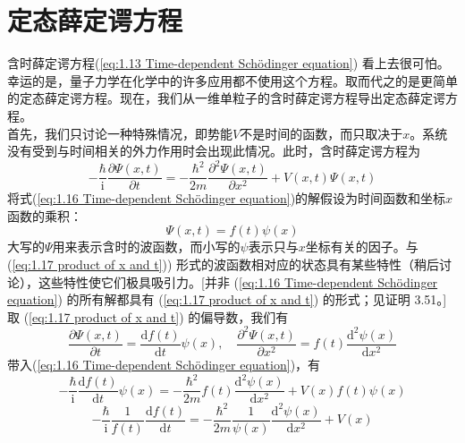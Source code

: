 	\section{定态薛定谔方程}
	含时薛定谔方程(\ref{eq:1.13 Time-dependent Schödinger equation}) 看上去很可怕。幸运的是，量子力学在化学中的许多应用都不使用这个方程。取而代之的是更简单的定态薛定谔方程。现在，我们从一维单粒子的含时薛定谔方程导出定态薛定谔方程。\\
	\indent 首先，我们只讨论一种特殊情况，即势能$V$不是时间的函数，而只取决于$x$。系统没有受到与时间相关的外力作用时会出现此情况。此时，含时薛定谔方程为
	\begin{equation}
		-\frac{\hbar}{\mathrm{i}}\frac{\partial \Psi \left(x,t\right)}{\partial t}= -\frac{\hbar^2}{2m}\frac{\partial^2 \Psi \left(x,t\right)}{\partial x^2}+ V\left(x,t\right)\Psi\left(x,t\right)
		\label{eq:1.16 Time-dependent Schödinger equation}
	\end{equation}
	将式(\ref{eq:1.16 Time-dependent Schödinger equation})的解假设为时间函数和坐标$x$函数的乘积：
	\begin{equation}
		\boxed{\Psi\left(x,t\right)=f\left(t\right)\psi\left(x\right)}
		\label{eq:1.17 product of x and t}
	\end{equation}
	大写的$\Psi$用来表示含时的波函数，而小写的$\psi$表示只与$x$坐标有关的因子。与 (\ref{eq:1.17 product of x and t})) 形式的波函数相对应的状态具有某些特性（稍后讨论），这些特性使它们极具吸引力。[并非 (\ref{eq:1.16 Time-dependent Schödinger equation}) 的所有解都具有 (\ref{eq:1.17 product of x and t}) 的形式；见证明 3.51。]取 (\ref{eq:1.17 product of x and t}) 的偏导数，我们有
	\begin{equation*}
		\frac{\partial \Psi\left(x,t\right)}{\partial t} = \frac{\mathrm{d} f\left(t\right)}{\mathrm{d}t} \psi\left(x\right), \quad \frac{\partial^2 \Psi \left(x,t\right)}{\partial x^2}= f\left(t\right) \frac{\mathrm{d}^2\psi\left(x\right)}{\mathrm{d}x^2}
	\end{equation*}
	带入(\ref{eq:1.16 Time-dependent Schödinger equation})，有
	\begin{equation*}
		-\frac{\hbar}{\mathrm{i}}\frac{\mathrm{d}f\left(t\right)}{\mathrm{d}t}\psi\left(x\right)=-\frac{\hbar^2}{2m}f\left(t\right)\frac{\mathrm{d}^2\psi\left(x\right)}{\mathrm{d}x^2}+V\left(x\right)f\left(t\right)\psi\left(x\right)
	\end{equation*}
	\begin{equation}
			-\frac{\hbar}{\mathrm{i}}\frac{1}{f\left(t\right)}\frac{\mathrm{d}f\left(t\right)}{\mathrm{d}t}=-\frac{\hbar^2}{2m}\frac{1}{\psi\left(x\right)}\frac{\mathrm{d}^2\psi\left(x\right)}{\mathrm{d}x^2}+V\left(x\right)
			\label{eq:1.18}
	\end{equation}
